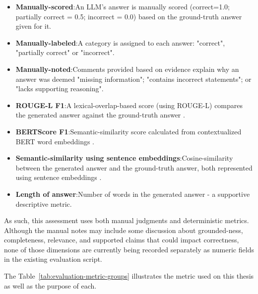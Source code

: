 \begin{itemize}
    \item {\textbf{Manually-scored}}:\quad An \ac{LLM}'s answer is manually scored (correct=1.0; partially correct = 0.5; incorrect = 0.0) based on the ground-truth answer given for it.
    \item {\textbf{Manually-labeled}}:\quad A category is assigned to each answer: "correct", "partially correct" or "incorrect".
    \item {\textbf{Manually-noted}}:\quad Comments provided based on evidence explain why an answer was deemed "missing information"; "contains incorrect statements"; or "lacks supporting reasoning".
    \item {\textbf{ROUGE-L F1}}:\quad A lexical-overlap-based score (using \acs{ROUGE-L}) compares the generated answer against the ground-truth answer \cite{lin2004rouge}.
    \item {\textbf{BERTScore F1}}:\quad Semantic-similarity score calculated from contextualized BERT word embeddings \cite{zhang2020bertscore}.
    \item {\textbf{Semantic-similarity using sentence embeddings}}:\quad Cosine-similarity between the generated answer and the ground-truth answer, both represented using sentence embeddings \cite{reimers2019sentencebert}.
    \item {\textbf{Length of answer}}:\quad Number of words in the generated answer - a supportive descriptive metric.
\end{itemize}

As such, this assessment uses both manual judgments and deterministic metrics. Although the manual notes may include some discussion about grounded-ness, completeness, relevance, and supported claims that could impact correctness, none of those dimensions are currently being recorded separately as numeric fields in the existing evaluation script.

The Table~\ref{tab:evaluation-metric-groups} illustrates the metric used on this thesis as well as the purpose of each.

